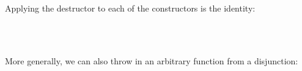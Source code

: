 Applying the destructor to each of the constructors is the identity:

\begin{fence}
\begin{code}%
\>[0]\AgdaSpace{}%
\AgdaSymbol{:}\AgdaSpace{}%
\AgdaSpace{}%
\AgdaSymbol{\{}\AgdaSpace{}%
\AgdaSpace{}%
\AgdaSymbol{:}\AgdaSpace{}%
\AgdaSymbol{\}}\AgdaSpace{}%
\AgdaSymbol{(}\AgdaSpace{}%
\AgdaSymbol{:}\AgdaSpace{}%
\AgdaSpace{}%
\AgdaSpace{}%
\AgdaSymbol{)}\AgdaSpace{}%
\AgdaSpace{}%
\AgdaSpace{}%
\AgdaSpace{}%
\AgdaSpace{}%
\AgdaSpace{}%
\AgdaSpace{}%
\<%
\\
\>[0]\AgdaSpace{}%
\AgdaSymbol{(}\AgdaSpace{}%
\AgdaSymbol{)}\AgdaSpace{}%
\AgdaSymbol{=}\AgdaSpace{}%
\<%
\\
\>[0]\AgdaSpace{}%
\AgdaSymbol{(}\AgdaSpace{}%
\AgdaSymbol{)}\AgdaSpace{}%
\AgdaSymbol{=}\AgdaSpace{}%
\<%
\end{code}
\end{fence}

More generally, we can also throw in an arbitrary function from a
disjunction:

